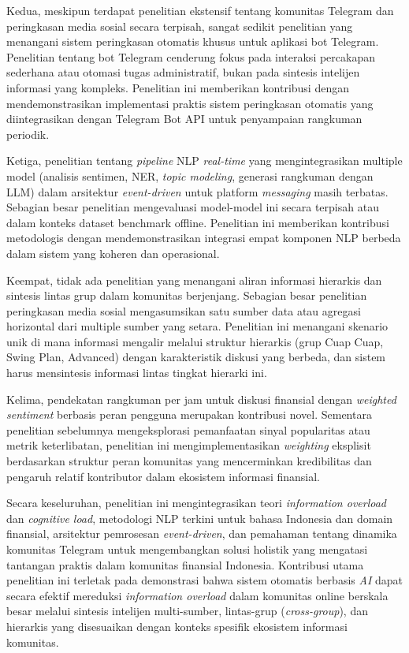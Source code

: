 Kedua, meskipun terdapat penelitian ekstensif tentang komunitas Telegram dan peringkasan media sosial secara terpisah, sangat sedikit penelitian yang menangani sistem peringkasan otomatis khusus untuk aplikasi bot Telegram. Penelitian tentang bot Telegram cenderung fokus pada interaksi percakapan sederhana atau otomasi tugas administratif, bukan pada sintesis intelijen informasi yang kompleks. Penelitian ini memberikan kontribusi dengan mendemonstrasikan implementasi praktis sistem peringkasan otomatis yang diintegrasikan dengan Telegram Bot API untuk penyampaian rangkuman periodik.

Ketiga, penelitian tentang \textit{pipeline} NLP \textit{real-time} yang mengintegrasikan multiple model (analisis sentimen, NER, \textit{topic modeling}, generasi rangkuman dengan LLM) dalam arsitektur \textit{event-driven} untuk platform \textit{messaging} masih terbatas. Sebagian besar penelitian mengevaluasi model-model ini secara terpisah atau dalam konteks dataset benchmark offline. Penelitian ini memberikan kontribusi metodologis dengan mendemonstrasikan integrasi empat komponen NLP berbeda dalam sistem yang koheren dan operasional.

Keempat, tidak ada penelitian yang menangani aliran informasi hierarkis dan sintesis lintas grup dalam komunitas berjenjang. Sebagian besar penelitian peringkasan media sosial mengasumsikan satu sumber data atau agregasi horizontal dari multiple sumber yang setara. Penelitian ini menangani skenario unik di mana informasi mengalir melalui struktur hierarkis (grup Cuap Cuap, Swing Plan, Advanced) dengan karakteristik diskusi yang berbeda, dan sistem harus mensintesis informasi lintas tingkat hierarki ini.

Kelima, pendekatan rangkuman per jam untuk diskusi finansial dengan \textit{weighted sentiment} berbasis peran pengguna merupakan kontribusi novel. Sementara penelitian sebelumnya mengeksplorasi pemanfaatan sinyal popularitas atau metrik keterlibatan, penelitian ini mengimplementasikan \textit{weighting} eksplisit berdasarkan struktur peran komunitas yang mencerminkan kredibilitas dan pengaruh relatif kontributor dalam ekosistem informasi finansial.

Secara keseluruhan, penelitian ini mengintegrasikan teori \textit{information overload} dan \textit{cognitive load}, metodologi NLP terkini untuk bahasa Indonesia dan domain finansial, arsitektur pemrosesan \textit{event-driven}, dan pemahaman tentang dinamika komunitas Telegram untuk mengembangkan solusi holistik yang mengatasi tantangan praktis dalam komunitas finansial Indonesia. Kontribusi utama penelitian ini terletak pada demonstrasi bahwa sistem otomatis berbasis \textit{AI} dapat secara efektif mereduksi \textit{information overload} dalam komunitas online berskala besar melalui sintesis intelijen multi-sumber, lintas-grup (\textit{cross-group}), dan hierarkis yang disesuaikan dengan konteks spesifik ekosistem informasi komunitas.
